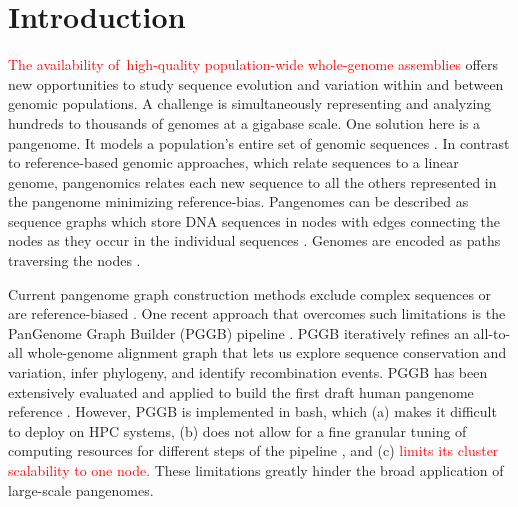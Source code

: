 \documentclass{bioinfo}
\theoremstyle{definition}
\newcommand{\red}[1]{{\textcolor{Red}{#1}}}
\begin{document}
	\section{Introduction}
	\red{The availability of~high-quality population-wide whole-genome assemblies} \citep{Liao2023, Kang2023, Weller2023, Zhou2022, Liu2020, Leonard2022} offers new opportunities to study sequence evolution and variation within and between genomic populations. 
	A challenge is simultaneously representing and analyzing hundreds to thousands of genomes at a gigabase scale. 
	One solution here is a pangenome. It models a population's entire set of genomic sequences \citep{Ballouz2019}. 
	In contrast to reference-based genomic approaches, which relate sequences to a linear genome, pangenomics relates each new sequence to all the others represented in the pangenome \citep{CompPan2016, Eizenga_2020, Sherman_2020} minimizing reference-bias. 
	Pangenomes can be described as sequence graphs which store DNA sequences in nodes with edges connecting the nodes as they occur in the individual sequences \citep{Hein1989}. 
	Genomes are encoded as paths traversing the nodes \citep{Garrison:2018}.
	
	Current pangenome graph construction methods exclude complex sequences or are reference-biased \citep{Chin2023, Minkin2016}.
	One recent approach that overcomes such limitations is the PanGenome Graph Builder (PGGB) pipeline \citep{Garrison2023}. 
	PGGB iteratively refines an all-to-all whole-genome alignment graph that lets us explore sequence conservation and variation, infer phylogeny, and identify recombination events. 
	PGGB has been extensively evaluated \citep{Garrison2023, Andreace2023} and applied to build the first draft human pangenome reference \citep{Liao2023}.
	However, PGGB is implemented in bash, which (a) makes it difficult to deploy on HPC systems, (b) does not allow for a fine granular tuning of computing resources for different steps of the pipeline \citep{Sztuka2024}, and (c) \red{limits its cluster scalability to one node.} These limitations greatly hinder the broad application of large-scale pangenomes.
	
\end{document}
